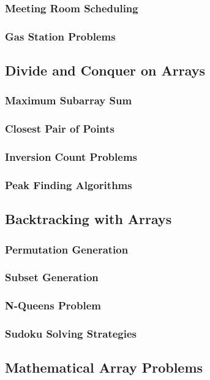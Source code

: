 \documentclass[12pt, oneside]{book}
\begin{document}
\subsubsection{Meeting Room Scheduling}
\subsubsection{Gas Station Problems}

\subsection{Divide and Conquer on Arrays}
\subsubsection{Maximum Subarray Sum}
\subsubsection{Closest Pair of Points}
\subsubsection{Inversion Count Problems}
\subsubsection{Peak Finding Algorithms}

\subsection{Backtracking with Arrays}
\subsubsection{Permutation Generation}
\subsubsection{Subset Generation}
\subsubsection{N-Queens Problem}
\subsubsection{Sudoku Solving Strategies}

\subsection{Mathematical Array Problems}
\end{document}
